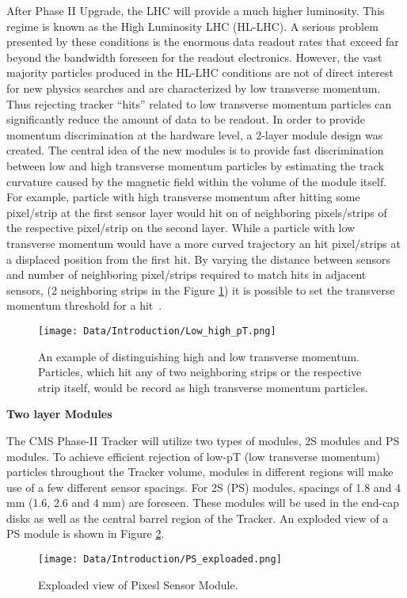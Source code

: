 After Phase II Upgrade, the LHC will provide a much higher luminosity. This regime is known as the High Luminosity LHC (HL-LHC). A serious problem presented by these conditions is the enormous data readout rates that exceed far beyond the bandwidth foreseen for the readout electronics.
However, the vast majority particles produced in the HL-LHC conditions are not of direct interest for new physics searches and are characterized by low transverse momentum. Thus rejecting tracker “hits” related to low transverse momentum particles can significantly reduce the amount of data to be readout. In order to provide momentum discrimination at the hardware level, a 2-layer module design was created. The central idea of the new modules is to provide fast discrimination between low and high transverse momentum particles by estimating the track curvature caused by the magnetic field within the volume of the module itself. For example, particle with high transverse momentum after hitting some pixel/strip at the first sensor layer would hit on of neighboring pixels/strips of the respective pixel/strip on the second layer. While a particle with low transverse momentum would have a more curved trajectory an hit pixel/strips at a displaced position from the first hit. By varying the distance between sensors and number of neighboring pixel/strips required to match hits in adjacent sensors, (2 neighboring strips in the Figure \ref{fig:low_high_pT}) it is possible to set the transverse momentum threshold for a hit~\cite{CMS_TECH_PHASE_II}.


\begin{figure}[ht]\centering
\texttt{[image: Data/Introduction/Low\_high\_pT.png]}
\caption{An example of distinguishing high and low transverse momentum. Particles, which hit any of two neighboring strips or the respective strip itself, would be record as high transverse momentum particles.}
\label{fig:low_high_pT}
\end{figure}


\textbf{Two layer Modules}

The CMS Phase-II Tracker will utilize two types of modules, 2S modules and PS modules. To achieve efficient rejection of low-pT (low transverse momentum) particles throughout the Tracker volume, modules in different regions will make use of a few different sensor spacings. For 2S (PS) modules, spacings of 1.8 and 4 mm (1.6, 2.6 and 4 mm) are foreseen. These modules will be used in the end-cap disks as well as the central barrel region of the Tracker. An exploded view of a PS module is shown in Figure \ref{fig:ps_exploaded}.
\begin{figure}[ht]\centering
\texttt{[image: Data/Introduction/PS\_exploaded.png]}
\caption{Exploaded view of Pixesl Sensor Module.}
\label{fig:ps_exploaded}
\end{figure}

